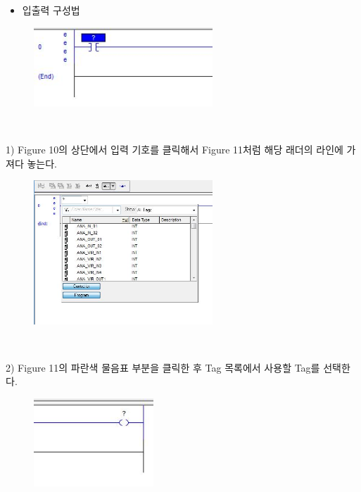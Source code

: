 \documentclass[11pt
  , a4paper
  , article
  , oneside
]{memoir}
\begin{document}
\begin{itemize}
	\item 입출력 구성법
\end{itemize}

\begin{figure}[h]
	\centering
	\includegraphics[width=0.6\textwidth]{./picture/input1.JPG}
	\caption{}
	\label{fig:}
\end{figure}  \

1) Figure 10의 상단에서 입력 기호를 클릭해서 Figure 11처럼 해당 래더의 라인에 가져다 놓는다.

\begin{figure}[h]
	\centering
	\includegraphics[width=0.6\textwidth]{./picture/input_tag.JPG}
	\caption{}
	\label{fig:}
\end{figure}  \


2) Figure 11의 파란색 물음표 부분을 클릭한 후 Tag 목록에서 사용할 Tag를 선택한다. 

\begin{figure}[h]
	\centering
	\includegraphics[width=0.4\textwidth]{./picture/coil.JPG}
	\caption{}
	\label{fig:}
\end{figure}  \
\end{document}
